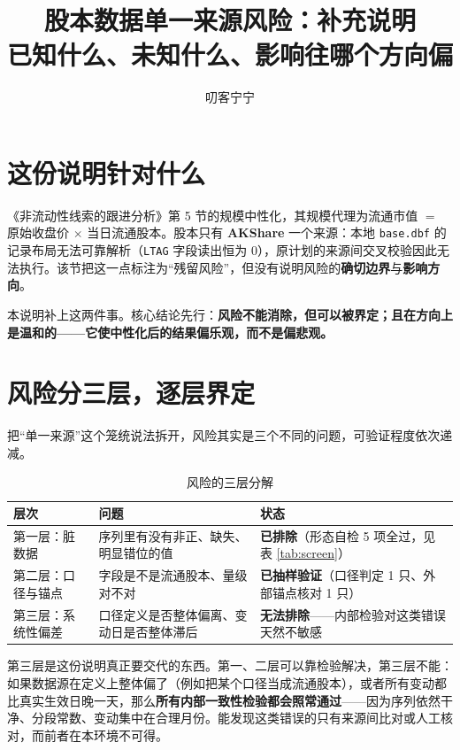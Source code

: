 \documentclass[11pt,a4paper]{ctexart}
\title{\bfseries 股本数据单一来源风险：补充说明\\\large 已知什么、未知什么、影响往哪个方向偏}
\author{\large 叨客宁宁}
\date{}
\begin{document}
\maketitle

\section{这份说明针对什么}

《非流动性线索的跟进分析》第 5 节的规模中性化，其规模代理为流通市值 $=$ 原始收盘价 $\times$ 当日流通股本。股本只有 \textbf{AKShare} 一个来源：本地 \texttt{base.dbf} 的记录布局无法可靠解析（\texttt{LTAG} 字段读出恒为 0），原计划的来源间交叉校验因此无法执行。该节把这一点标注为“残留风险”，但没有说明风险的\textbf{确切边界}与\textbf{影响方向}。

本说明补上这两件事。核心结论先行：\textbf{风险不能消除，但可以被界定；且在方向上是温和的——它使中性化后的结果偏乐观，而不是偏悲观。}

\section{风险分三层，逐层界定}

把“单一来源”这个笼统说法拆开，风险其实是三个不同的问题，可验证程度依次递减。

\begin{table}[htbp]
\centering
\caption{风险的三层分解}
\label{tab:layers}
\begin{tabular}{@{}>{\raggedright\arraybackslash}p{2.6cm}>{\raggedright\arraybackslash}p{5.6cm}>{\raggedright\arraybackslash}p{6.2cm}@{}}
\toprule
层次 & 问题 & 状态 \\
\midrule
第一层：脏数据 & 序列里有没有非正、缺失、明显错位的值 & \textbf{已排除}（形态自检 5 项全过，见表 \ref{tab:screen}） \\
\addlinespace
第二层：口径与锚点 & 字段是不是流通股本、量级对不对 & \textbf{已抽样验证}（口径判定 1 只、外部锚点核对 1 只） \\
\addlinespace
第三层：系统性偏差 & 口径定义是否整体偏离、变动日是否整体滞后 & \textbf{无法排除}——内部检验对这类错误天然不敏感 \\
\bottomrule
\end{tabular}
\end{table}

第三层是这份说明真正要交代的东西。第一、二层可以靠检验解决，第三层不能：如果数据源在定义上整体偏了（例如把某个口径当成流通股本），或者所有变动都比真实生效日晚一天，那么\textbf{所有内部一致性检验都会照常通过}——因为序列依然干净、分段常数、变动集中在合理月份。能发现这类错误的只有来源间比对或人工核对，而前者在本环境不可得。
\end{document}
